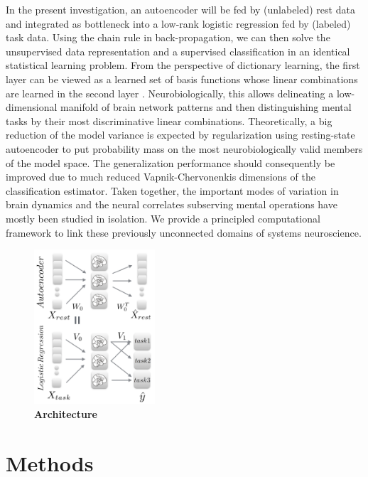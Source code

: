 \documentclass{article} %
\begin{document}
In the present investigation,
an autoencoder will be fed by (unlabeled) rest data and
integrated as bottleneck
into a low-rank logistic regression fed by (labeled) task data.
Using the chain rule in back-propagation, we can then
solve the unsupervised data representation and a supervised classification
in an identical statistical learning problem.
%
From the perspective of dictionary learning, the first layer can be
viewed as a learned set of basis functions
whose linear combinations are learned
in the second layer \cite{olshausen96}.
%
Neurobiologically, this allows 
delineating a low-dimensional manifold of brain network patterns and then 
distinguishing mental tasks
by their most discriminative linear combinations.
%
Theoretically, a big reduction of the model variance is expected by
regularization using resting-state autoencoder
to put probability mass on the most neurobiologically
valid members of the model space.
%
The generalization performance should consequently be improved due to 
much reduced Vapnik-Chervonenkis dimensions of the classification estimator.
%
Taken together,
the important modes of variation in brain dynamics and
the neural correlates subserving mental operations
have mostly been studied in isolation.
We provide a principled computational framework to link these previously
unconnected domains of systems neuroscience.

\begin{figure}
  \begin{center}
    \includegraphics[width=0.40\textwidth]{figures/figure1.png}
  \end{center}
  \caption {\textbf{Architecture}
  }
\end{figure}

%
\section{Methods}
%
\end{document}
